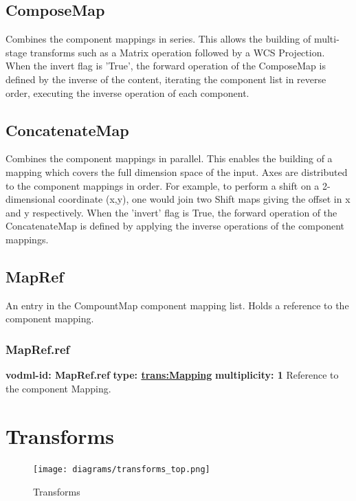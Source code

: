   \subsection{ComposeMap}
  \label{sect:ComposeMap}
    Combines the component mappings in series. This allows the building of multi-stage transforms such as a Matrix operation followed by a WCS Projection. When the invert flag is 'True', the forward operation of the ComposeMap is defined by the inverse of the content, iterating the component list in reverse order, executing the inverse operation of each component.

  \subsection{ConcatenateMap}
  \label{sect:ConcatenateMap}
    Combines the component mappings in parallel. This enables the building of a mapping which covers the full dimension space of the input. Axes are distributed to the component mappings in order. For example, to perform a shift on a 2-dimensional coordinate (x,y), one would join two Shift maps giving the offset in x and y respectively. When the 'invert' flag is True, the forward operation of the ConcatenateMap is defined by applying the inverse operations of the component mappings.

  \subsection{MapRef}
  \label{sect:MapRef}
    An entry in the CompountMap component mapping list. Holds a reference to the component mapping.

    \subsubsection{MapRef.ref}
      \textbf{vodml-id: MapRef.ref} \newline
      \textbf{type: \hyperref[sect:Mapping]{trans:Mapping}} \newline
      \textbf{multiplicity: 1} \newline 
      Reference to the component Mapping.


\pagebreak
\section{Transforms}

  \begin{figure}[h]
  \begin{center}
    \texttt{[image: diagrams/transforms\_top.png]}
    \caption{Transforms}\label{fig:Transforms}
  \end{center}
  \end{figure}

